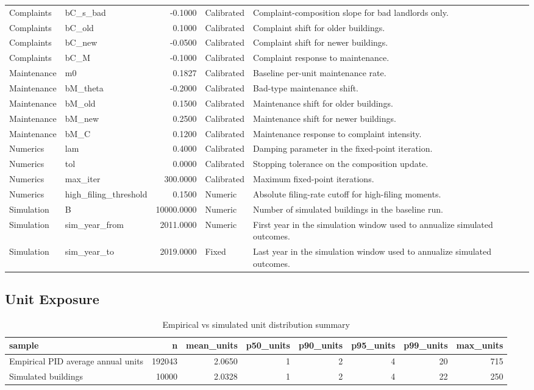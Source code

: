 \documentclass[
  11pt,
]{article}
\begin{document}
\begin{table}
\begin{tabular}[t]{llrll}
Complaints & bC\_s\_bad & -0.1000 & Calibrated & Complaint-composition slope for bad landlords only.\\
Complaints & bC\_old & 0.1000 & Calibrated & Complaint shift for older buildings.\\
Complaints & bC\_new & -0.0500 & Calibrated & Complaint shift for newer buildings.\\
Complaints & bC\_M & -0.1000 & Calibrated & Complaint response to maintenance.\\
Maintenance & m0 & 0.1827 & Calibrated & Baseline per-unit maintenance rate.\\
Maintenance & bM\_theta & -0.2000 & Calibrated & Bad-type maintenance shift.\\
Maintenance & bM\_old & 0.1500 & Calibrated & Maintenance shift for older buildings.\\
Maintenance & bM\_new & 0.2500 & Calibrated & Maintenance shift for newer buildings.\\
Maintenance & bM\_C & 0.1200 & Calibrated & Maintenance response to complaint intensity.\\
Numerics & lam & 0.4000 & Calibrated & Damping parameter in the fixed-point iteration.\\
Numerics & tol & 0.0000 & Calibrated & Stopping tolerance on the composition update.\\
Numerics & max\_iter & 300.0000 & Calibrated & Maximum fixed-point iterations.\\
Numerics & high\_filing\_threshold & 0.1500 & Numeric & Absolute filing-rate cutoff for high-filing moments.\\
Simulation & B & 10000.0000 & Numeric & Number of simulated buildings in the baseline run.\\
Simulation & sim\_year\_from & 2011.0000 & Numeric & First year in the simulation window used to annualize simulated outcomes.\\
Simulation & sim\_year\_to & 2019.0000 & Fixed & Last year in the simulation window used to annualize simulated outcomes.\\
\bottomrule
\end{tabular}
\end{table}

\subsection{Unit Exposure}\label{unit-exposure}

\begin{table}

\caption{Empirical vs simulated unit distribution summary}
\centering
\begin{tabular}[t]{lrrrrrrr}
\toprule
sample & n & mean\_units & p50\_units & p90\_units & p95\_units & p99\_units & max\_units\\
\midrule
Empirical PID average annual units & 192043 & 2.0650 & 1 & 2 & 4 & 20 & 715\\
Simulated buildings & 10000 & 2.0328 & 1 & 2 & 4 & 22 & 250\\
\bottomrule
\end{tabular}
\end{table}
\end{document}
